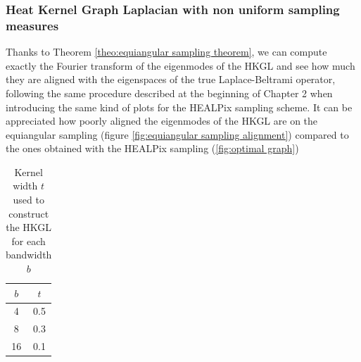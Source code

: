 \subsubsection{Heat Kernel Graph Laplacian with non uniform sampling measures}
Thanks to Theorem \ref{theo:equiangular sampling theorem}, we can compute exactly the Fourier transform of the eigenmodes of the HKGL and see how much they are aligned with the eigenspaces of the true Laplace-Beltrami operator, following the same procedure described at the beginning of Chapter 2 when introducing the same kind of plots for the HEALPix sampling scheme. It can be appreciated how poorly aligned the eigenmodes of the HKGL are on the equiangular sampling (figure \ref{fig:equiangular sampling alignment}) compared to the ones obtained with the HEALPix sampling (\ref{fig:optimal graph})


\begin{table}[h!]
	\centering
	\begin{tabular}{ c|c } 
$b$ & $t$ \\ 
	\hline
4 & 0.5 \\ 
8 & 0.3 \\ 
16 & 0.1 \\ 
	\end{tabular}
	\caption{\label{table:equiangular kernel width}Kernel width $t$ used to construct the HKGL for each bandwidth $b$}
\end{table}

